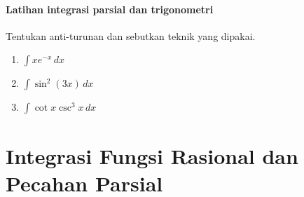 \documentclass{../../kalkulus-ppt}
\begin{document}
\begin{frame}{\insertsection}
    \framesubtitle{Latihan integrasi parsial dan trigonometri}
    \begin{latihan}
        Tentukan anti-turunan dan sebutkan teknik yang dipakai.
        \begin{enumerate}
            \item $\int xe^{-x}\,dx$
            \item $\int\sin^2(3x)\,dx$
            \item $\int\cot x\csc^3x\,dx$
        \end{enumerate}
    \end{latihan}
\end{frame}

\section[Integrasi Fungsi Rasional]{Integrasi Fungsi Rasional dan Pecahan Parsial}
\end{document}
